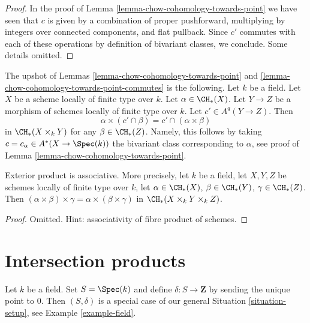 \begin{proof}
In the proof of Lemma \ref{lemma-chow-cohomology-towards-point}
we have seen that $c$ is given by a combination of
proper pushforward, multiplying by integers over connected
components, and flat pullback. Since $c'$ commutes with each of
these operations by definition of bivariant classes, we conclude.
Some details omitted.
\end{proof}

\begin{remark}
\label{remark-commuting-exterior}
The upshot of Lemmas \ref{lemma-chow-cohomology-towards-point}
and \ref{lemma-chow-cohomology-towards-point-commutes} is the following.
Let $k$ be a field. Let $X$ be a scheme locally of finite type over $k$.
Let $\alpha \in \CH_*(X)$. Let $Y \to Z$ be a morphism of schemes
locally of finite type over $k$. Let $c' \in A^q(Y \to Z)$. Then
$$
\alpha \times (c' \cap \beta) = c' \cap (\alpha \times \beta)
$$
in $\CH_*(X \times_k Y)$ for any $\beta \in \CH_*(Z)$. Namely, this
follows by taking $c = c_\alpha \in A^*(X \to \Spec(k))$ the bivariant class
corresponding to $\alpha$, see proof of
Lemma \ref{lemma-chow-cohomology-towards-point}.
\end{remark}

\begin{lemma}
\label{lemma-exterior-product-associative}
Exterior product is associative. More precisely, let $k$ be a field,
let $X, Y, Z$ be schemes locally of finite type over $k$, let
$\alpha \in \CH_*(X)$, $\beta \in \CH_*(Y)$, $\gamma \in \CH_*(Z)$.
Then $(\alpha \times \beta) \times \gamma =
\alpha \times (\beta \times \gamma)$ in $\CH_*(X \times_k Y \times_k Z)$.
\end{lemma}

\begin{proof}
Omitted. Hint: associativity of fibre product of schemes.
\end{proof}







\section{Intersection products}
\label{section-intersection-product}

\noindent
Let $k$ be a field. Set $S = \Spec(k)$ and define $\delta : S \to \mathbf{Z}$
by sending the unique point to $0$. Then $(S, \delta)$ is a special case of
our general Situation \ref{situation-setup}, see
Example \ref{example-field}.

